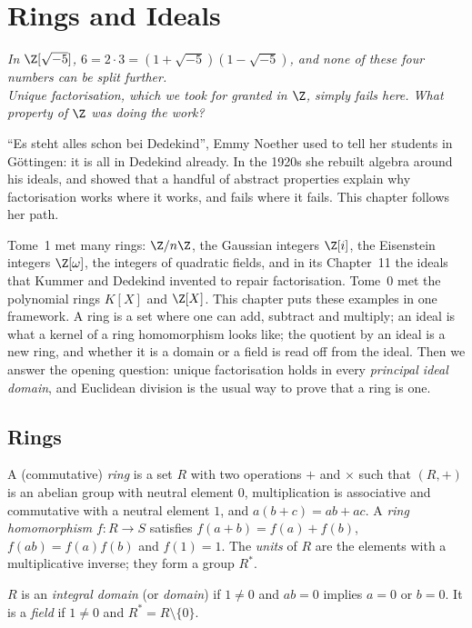 \chapter{Rings and Ideals}

\begin{center}\itshape
In $\Z[\sqrt{-5}]$, $6=2\cdot3=(1+\sqrt{-5})(1-\sqrt{-5})$, and none of these four numbers can be split further.\\
Unique factorisation, which we took for granted in $\Z$, simply fails here. What property of $\Z$ was doing the work?
\end{center}

``Es steht alles schon bei Dedekind'', Emmy Noether used to tell her students in G\"ottingen: it is all in Dedekind already. In the 1920s she rebuilt
algebra around his ideals, and showed that a handful of abstract properties explain why factorisation works where it works, and fails where it
fails. This chapter follows her path.

Tome~1 met many rings: $\Z/n\Z$, the Gaussian integers $\Z[i]$, the Eisenstein integers $\Z[\omega]$, the integers of quadratic fields, and in its Chapter~11 the ideals that Kummer and Dedekind invented to repair factorisation. Tome~0 met the polynomial rings $K[X]$ and $\Z[X]$. This chapter puts these examples in one framework. A ring is a set where one can add, subtract and multiply; an ideal is what a kernel of a ring homomorphism looks like; the quotient by an ideal is a new ring, and whether it is a domain or a field is read off from the ideal. Then we answer the opening question: unique factorisation holds in every \emph{principal ideal domain}, and Euclidean division is the usual way to prove that a ring is one.

\section{Rings}

\begin{definition}
A (commutative) \emph{ring} is a set $R$ with two operations $+$ and $\times$ such that $(R,+)$ is an abelian group with neutral element $0$, multiplication is associative and commutative with a neutral element $1$, and $a(b+c)=ab+ac$. A \emph{ring homomorphism} $f:R\to S$ satisfies $f(a+b)=f(a)+f(b)$, $f(ab)=f(a)f(b)$ and $f(1)=1$. The \emph{units} of $R$ are the elements with a multiplicative inverse; they form a group $R^*$.

$R$ is an \emph{integral domain} (or \emph{domain}) if $1\ne0$ and $ab=0$ implies $a=0$ or $b=0$. It is a \emph{field} if $1\ne0$ and $R^*=R\setminus\{0\}$.
\end{definition}

